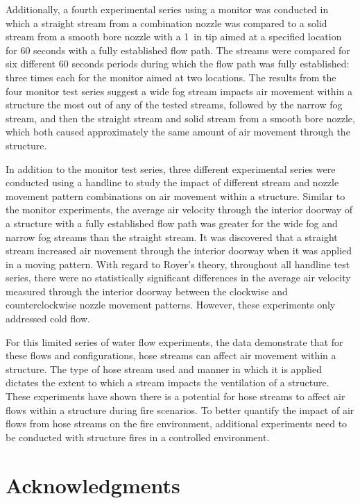 \documentclass[12pt,oneside]{book}
\begin{document}
Additionally, a fourth experimental series using a monitor was conducted in which a straight stream from a combination nozzle was compared to a solid stream from a smooth bore nozzle with a 1~in tip aimed at a specified location for 60 seconds with a fully established flow path. The streams were compared for six different 60 seconds periods during which the flow path was fully established: three times each for the monitor aimed at two locations. The results from the four monitor test series suggest a wide fog stream impacts air movement within a structure the most out of any of the tested streams, followed by the narrow fog stream, and then the straight stream and solid stream from a smooth bore nozzle, which both caused approximately the same amount of air movement through the structure.

In addition to the monitor test series, three different experimental series were conducted using a handline to study the impact of different stream and nozzle movement pattern combinations on air movement within a structure. Similar to the monitor experiments, the average air velocity through the interior doorway of a structure with a fully established flow path was greater for the wide fog and narrow fog streams than the straight stream. It was discovered that a straight stream increased air movement through the interior doorway when it was applied in a moving pattern. With regard to Royer's theory, throughout all handline test series, there were no statistically significant differences in the average air velocity measured through the interior doorway between the clockwise and counterclockwise nozzle movement patterns. However, these experiments only addressed cold flow.

For this limited series of water flow experiments, the data demonstrate that for these flows and configurations, hose streams can affect air movement within a structure. The type of hose stream used and manner in which it is applied dictates the extent to which a stream impacts the ventilation of a structure. These experiments have shown there is a potential for hose streams to affect air flows within a structure during fire scenarios. To better quantify the impact of air flows from hose streams on the fire environment, additional experiments need to be conducted with structure fires in a controlled environment.

\chapter{Acknowledgments}
\label{chap:acknowledgments}
\end{document}

